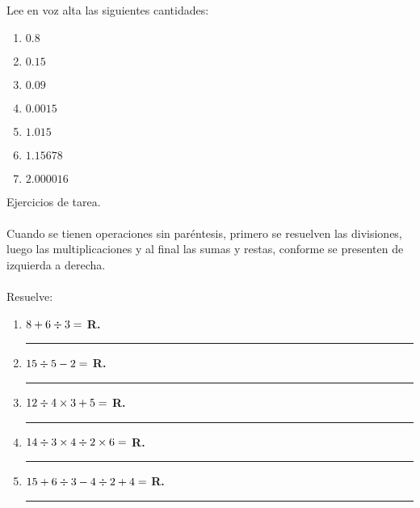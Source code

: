 Lee en voz alta las siguientes cantidades:
\begin{enumerate}[label=\alph*)]
\item $0.8$
\item $0.15$
\item $0.09$
\item $0.0015$
\item $1.015$
\item $1.15678$
\item $2.000016$
\end{enumerate}

\newpage

Ejercicios de tarea.
\\
\\
Cuando se tienen operaciones sin paréntesis, primero se resuelven las divisiones, luego las multiplicaciones y al final las sumas y restas, conforme se presenten de izquierda a derecha.
\\
\\
Resuelve:
\begin{enumerate}
\item $8 + 6 \divisionsymbol 3 =$ \hspace{0.3cm} \textbf{R.} \rule{3cm}{0.1mm}
\item $15 \divisionsymbol 5 - 2 =$ \hspace{0.3cm} \textbf{R.} \rule{3cm}{0.1mm}
\item $12 \divisionsymbol 4 \times 3 + 5 =$ \hspace{0.3cm} \textbf{R.} \rule{3cm}{0.1mm}
\item $14 \divisionsymbol 3 \times 4 \divisionsymbol 2 \times 6 =$ \hspace{0.3cm} \textbf{R.} \rule{3cm}{0.1mm}
\item $15 + 6 \divisionsymbol 3 - 4 \divisionsymbol 2 + 4 =$ \hspace{0.3cm} \textbf{R.} \rule{3cm}{0.1mm}
\end{enumerate}
